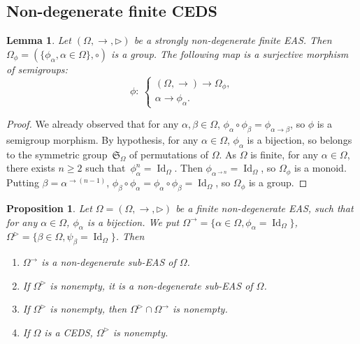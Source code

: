\documentclass[10pt,a4paper]{amsart}
\numberwithin{equation}{section}
\newtheorem{Lemma}[Theorem]{Lemma}
\newtheorem{Proposition}[Theorem]{Proposition}
 { \theoremstyle{definition}
\newtheorem{Definition}[Theorem]{Definition}
\newtheorem{Note}[Theorem]{Note}
\newtheorem{Example}[Theorem]{Example}
\newtheorem{Remark}[Theorem]{Remark}
\newtheorem{Notation}[Theorem]{Notation}}
\begin{document}
\subsection{Non-degenerate finite CEDS}

\begin{Lemma}\label{lem3.9}
Let $(\Omega,\rightarrow,\triangleright)$ be a strongly non-degenerate finite EAS. Then $\Omega_\phi=(\{\phi_\alpha, \alpha\in \Omega\},\circ)$ is a group. The following map is a surjective morphism of semigroups:
\[\phi\colon \ \begin{cases}
(\Omega,\rightarrow) \longrightarrow \Omega_\phi,\\
\alpha \longrightarrow \phi_\alpha.
\end{cases}\]
\end{Lemma}

\begin{proof}
We already observed that for any $\alpha,\beta \in \Omega$, $\phi_\alpha\circ \phi_\beta=\phi_{\alpha\rightarrow \beta}$, so $\phi$ is a semigroup morphism.
By hypothesis, for any $\alpha \in \Omega$, $\phi_\alpha$ is a bijection, so belongs to the symmetric group~$\mathfrak{S}_\Omega$ of permutations of $\Omega$.
As $\Omega$ is finite, for any $\alpha \in \Omega$, there exists $n\geqslant 2$ such that~${\phi_\alpha^n=\operatorname{Id}_\Omega}$.
Then $\phi_{\alpha^{\rightarrow n}}=\operatorname{Id}_\Omega$, so $\Omega_\phi$ is a monoid. Putting $\beta=\alpha^{\rightarrow(n-1)}$, $\phi_\beta\circ \phi_\alpha=\phi_\alpha\circ \phi_\beta=\operatorname{Id}_\Omega$, so $\Omega_\phi$ is a group.
\end{proof}

\begin{Proposition}\label{prop3.10}
Let $\Omega=(\Omega,\rightarrow,\triangleright)$ be a finite non-degenerate EAS, such that for any $\alpha \in \Omega$, $\phi_\alpha$ is a bijection. We put
$
\Omega^\rightarrow=\{\alpha\in \Omega, \phi_\alpha=\operatorname{Id}_\Omega\}$, $\Omega^\triangleright =\{\beta \in \Omega, \psi_\beta=\operatorname{Id}_\Omega\}$.
Then
\begin{enumerate}\itemsep=0pt
\item[$(1)$] $\Omega^\rightarrow$ is a non-degenerate sub-EAS of $\Omega$.
\item[$(2)$] If $\Omega^\triangleright$ is nonempty, it is a non-degenerate sub-EAS of $\Omega$.
\item[$(3)$] If $\Omega^\triangleright$ is nonempty, then $\Omega^\triangleright \cap \Omega^\rightarrow$ is nonempty.
\item[$(4)$] If $\Omega$ is a CEDS, $\Omega^\triangleright$ is nonempty.
\end{enumerate}\end{Proposition}
\end{document}
